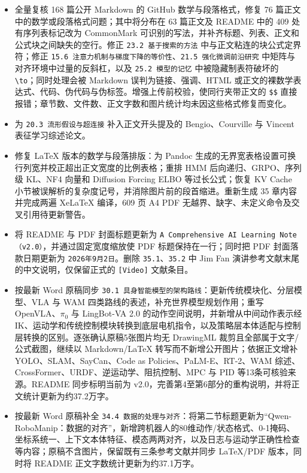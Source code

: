 \begin{itemize}
\item
  全量复核 168 篇公开 Markdown 的 GitHub 数学与段落格式，修复 76 篇正文中的数学或段落格式问题；其中将分布在 63 篇正文及 README 中的 409 处有序列表标记改为 CommonMark 可识别的写法，并补齐标题、列表、正文和公式块之间缺失的空行。修正 \texttt{23.2\ 基于搜索的方法} 中与正文粘连的块公式定界符；修正 \texttt{15.6\ 注意力机制与梯度下降的等价性}、\texttt{21.5\ 强化微调前沿研究} 中矩阵与对齐环境中过量的反斜杠，以及 \texttt{25.2\ 模型的记忆} 中被隐藏制表符破坏的 \texttt{\textbackslash{}to}；同时处理会被 Markdown 误判为链接、强调、HTML 或正文的裸数学表达式、代码、伪代码与伪标签。增强上传前校验，使同行夹带正文的 \texttt{\$\$} 直接报错；章节数、文件数、正文字数和图片统计均未因这些格式修复而变化。
\item
  为 \texttt{20.3\ 流形假设与超连接} 补入正文开头提及的 Bengio、Courville 与 Vincent 表征学习综述论文。
\item
  修复 LaTeX 版本的数学与段落排版：为 Pandoc 生成的无界宽表格设置可换行列宽并校正超出正文宽度的比例表格；重排 HMM 后向递归、GRPO、序列级 KL、NF4 向量和 Diffusion Forcing ELBO 等过长公式；恢复 KV Cache 小节被误解析的复杂度记号，并消除图片前的段首缩进。重新生成 35 章内容并完成两遍 XeLaTeX 编译，609 页 A4 PDF 无越界、缺字、未定义命令及交叉引用待更新警告。
\item
  将 README 与 PDF 封面标题更新为 \texttt{A\ Comprehensive\ AI\ Learning\ Note（v2.0）}，并通过固定宽度缩放使 PDF 标题保持在一行；同时把 PDF 封面落款日期更新为 \texttt{2026年9月2日}。删除 \texttt{35.1}、\texttt{35.2} 中 Jim Fan 演讲参考文献末尾的中文说明，仅保留正式的 \texttt{{[}Video{]}} 文献条目。
\item
  按最新 Word 原稿同步 \texttt{30.1\ 具身智能模型的架构路线}：更新传统模块化、分层模型、VLA 与 WAM 四类路线的表述，补充世界模型规划作用；重写 OpenVLA、\(\pi_0\) 与 LingBot-VA 2.0 的动作空间说明，并新增从中间动作表示经 IK、运动学和传统控制模块转换到底层电机指令，以及策略层本体适配与控制层转换的区别。逐张确认原稿5张图片均无 DrawingML 裁剪且全部属于文字/公式截图，继续以 Markdown/LaTeX 转写而不新增公开图片；依据正文增补 YOLO、SLAM、SayCan、Code as Policies、PaLM-E、RT-2、WAM 综述、CrossFormer、URDF、逆运动学、阻抗控制、MPC 与 PID 等13条可核验来源。README 同步标明当前为 v2.0，完善第4至第6部分的重构说明，并将正文统计更新为约37.2万字。
\item
  按最新 Word 原稿补全 \texttt{34.4\ 数据的处理与对齐}：将第二节标题更新为``Qwen-RoboManip：数据的对齐''，新增跨机器人的80维动作/状态格式、0-1掩码、坐标系统一、上下文本体特征、模态两两对齐，以及日志与运动学正确性检查等内容；原稿不含图片，保留既有三条参考文献并同步 LaTeX/PDF 版本，同时将 README 正文字数统计更新为约37.1万字。

\end{itemize}
